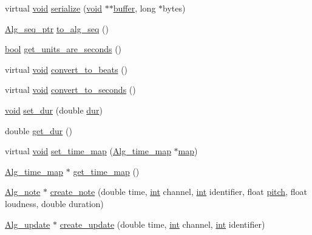 \begin{DoxyCompactItemize}
\item 
virtual \hyperlink{sound_8c_ae35f5844602719cf66324f4de2a658b3}{void} \hyperlink{class_alg__track_a843e8a18ef3b750aaf576a60d347a649}{serialize} (\hyperlink{sound_8c_ae35f5844602719cf66324f4de2a658b3}{void} $\ast$$\ast$\hyperlink{structbuffer}{buffer}, long $\ast$bytes)
\item 
\hyperlink{allegro_8h_aad5a663237745add3ab7fec40d5f2c87}{Alg\+\_\+seq\+\_\+ptr} \hyperlink{class_alg__track_ae850bac66a5bccfb6cdd59e16065ff2b}{to\+\_\+alg\+\_\+seq} ()
\item 
\hyperlink{mac_2config_2i386_2lib-src_2libsoxr_2soxr-config_8h_abb452686968e48b67397da5f97445f5b}{bool} \hyperlink{class_alg__track_ab6daa2c5bf70133539ca186eca3d5fa2}{get\+\_\+units\+\_\+are\+\_\+seconds} ()
\item 
virtual \hyperlink{sound_8c_ae35f5844602719cf66324f4de2a658b3}{void} \hyperlink{class_alg__track_a1b9aaa0cf14501de304b917f8491910e}{convert\+\_\+to\+\_\+beats} ()
\item 
virtual \hyperlink{sound_8c_ae35f5844602719cf66324f4de2a658b3}{void} \hyperlink{class_alg__track_a6217de3d59379da7b0fa62011ba05cfb}{convert\+\_\+to\+\_\+seconds} ()
\item 
\hyperlink{sound_8c_ae35f5844602719cf66324f4de2a658b3}{void} \hyperlink{class_alg__track_ac1c85f55f171236cd6fcebf5d621efb2}{set\+\_\+dur} (double \hyperlink{seqread_8c_a3c79b5a9ee81c3835b8de9b0d900d2de}{dur})
\item 
double \hyperlink{class_alg__track_ae75c10dd3cf2cb2b82d5506449fae4e7}{get\+\_\+dur} ()
\item 
virtual \hyperlink{sound_8c_ae35f5844602719cf66324f4de2a658b3}{void} \hyperlink{class_alg__track_a582e535d36415891ae7a6037bdbcd7f9}{set\+\_\+time\+\_\+map} (\hyperlink{class_alg__time__map}{Alg\+\_\+time\+\_\+map} $\ast$\hyperlink{structmap}{map})
\item 
\hyperlink{class_alg__time__map}{Alg\+\_\+time\+\_\+map} $\ast$ \hyperlink{class_alg__track_ae8e1634bcf46d3cce796ed82b76e8b82}{get\+\_\+time\+\_\+map} ()
\item 
\hyperlink{class_alg__note}{Alg\+\_\+note} $\ast$ \hyperlink{class_alg__track_a2eb672f988222c1e825eceb4b97aeb1c}{create\+\_\+note} (double time, \hyperlink{xmltok_8h_a5a0d4a5641ce434f1d23533f2b2e6653}{int} channel, \hyperlink{xmltok_8h_a5a0d4a5641ce434f1d23533f2b2e6653}{int} identifier, float \hyperlink{seqread_8c_a7f083f7b76ea4d09b2820211a2b0d04e}{pitch}, float loudness, double duration)
\item 
\hyperlink{class_alg__update}{Alg\+\_\+update} $\ast$ \hyperlink{class_alg__track_a8467969e1995457b1c05c33bb560021c}{create\+\_\+update} (double time, \hyperlink{xmltok_8h_a5a0d4a5641ce434f1d23533f2b2e6653}{int} channel, \hyperlink{xmltok_8h_a5a0d4a5641ce434f1d23533f2b2e6653}{int} identifier)
$$
\end{DoxyCompactItemize}
